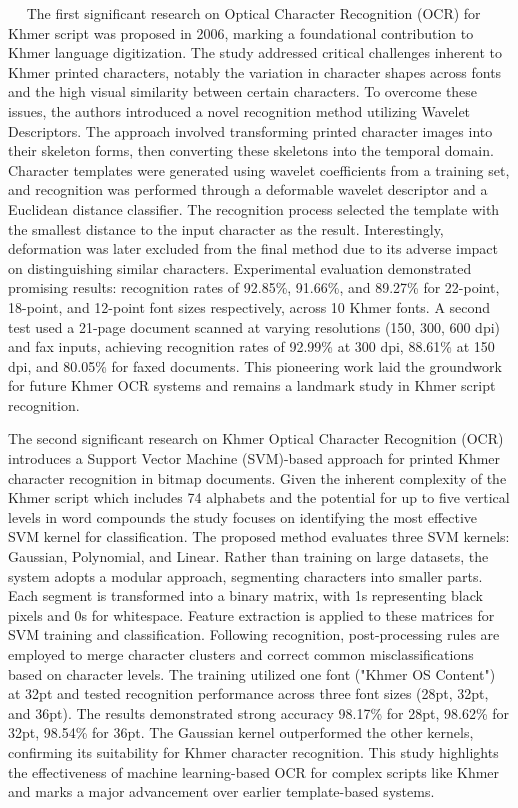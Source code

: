 ​ ​ ​ ​ \citet{CheyFirstOCR} The first significant research on Optical Character Recognition (OCR) 
for Khmer script was proposed in 2006, marking a foundational contribution 
to Khmer language digitization. The study addressed critical challenges 
inherent to Khmer printed characters, notably the variation in character 
shapes across fonts and the high visual similarity between certain 
characters. To overcome these issues, the authors introduced a novel 
recognition method utilizing Wavelet Descriptors. The approach involved 
transforming printed character images into their skeleton forms, 
then converting these skeletons into the temporal domain. Character 
templates were generated using wavelet coefficients from a training set, 
and recognition was performed through a deformable wavelet descriptor 
and a Euclidean distance classifier. The recognition process selected 
the template with the smallest distance to the input character as the 
result. Interestingly, deformation was later excluded from the final 
method due to its adverse impact on distinguishing similar characters. 
Experimental evaluation demonstrated promising results: recognition 
rates of 92.85\%, 91.66\%, and 89.27\% for 22-point, 18-point, and 
12-point font sizes respectively, across 10 Khmer fonts. A second 
test used a 21-page document scanned at varying resolutions 
(150, 300, 600 dpi) and fax inputs, achieving recognition rates 
of 92.99\% at 300 dpi, 88.61\% at 150 dpi, and 80.05\% for faxed documents. 
This pioneering work laid the groundwork for future Khmer OCR systems 
and remains a landmark study in Khmer script recognition.

\citet{Sok&Taing2014} The second significant research on 
Khmer Optical Character Recognition (OCR) introduces a Support 
Vector Machine (SVM)-based approach for printed Khmer character 
recognition in bitmap documents. Given the inherent complexity 
of the Khmer script which includes 74 alphabets and the potential 
for up to five vertical levels in word compounds the study focuses 
on identifying the most effective SVM kernel for classification.
The proposed method evaluates three SVM kernels: Gaussian, Polynomial, 
and Linear. Rather than training on large datasets, the system adopts 
a modular approach, segmenting characters into smaller parts. Each 
segment is transformed into a binary matrix, with 1s representing 
black pixels and 0s for whitespace. Feature extraction is applied 
to these matrices for SVM training and classification.
Following recognition, post-processing rules are employed to merge 
character clusters and correct common misclassifications based on 
character levels. The training utilized one font ("Khmer OS Content") 
at 32pt and tested recognition performance across three font sizes 
(28pt, 32pt, and 36pt). The results demonstrated strong accuracy
98.17\% for 28pt, 98.62\% for 32pt, 98.54\% for 36pt.
The Gaussian kernel outperformed the other kernels, confirming its 
suitability for Khmer character recognition. This study highlights 
the effectiveness of machine learning-based OCR for complex scripts 
like Khmer and marks a major advancement over earlier template-based 
systems.

